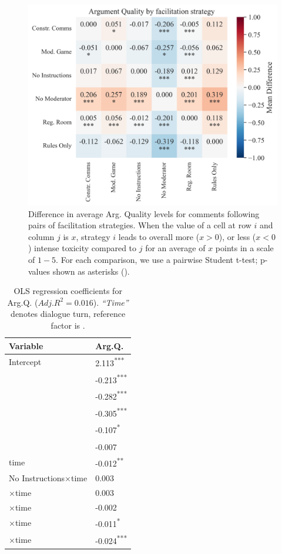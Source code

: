 \begin{figure}[t]
	\includegraphics[width=\linewidth]{resources/argumentq_stats.png}
	\centering
	\caption{Difference in average Arg. Quality levels for comments following pairs of facilitation strategies. When the value of a cell at row $i$ and column $j$ is $x$, strategy $i$ leads to overall more ($x>0$), or less ($x<0$) intense toxicity compared to $j$ for an average of $x$ points in a scale of $1-5$. For each comparison, we use a pairwise Student t-test; p-values shown as asterisks (\asterisknote).}
	\label{fig:aq_stats}
\end{figure}


\begin{table}[t]
	\centering
	\begin{tabular}{p{5cm} p{1.5cm}}
		\toprule
		\textbf{Variable} & \textbf{Arg.Q.} \\
		\midrule
		Intercept & 2.113\textsuperscript{***} \\
		\strategynoinstr & -0.213\textsuperscript{***} \\
		\strategymodgame & -0.282\textsuperscript{***} \\
		\strategyrules & -0.305\textsuperscript{***} \\
		\strategyregroom & -0.107\textsuperscript{*} \\
		\strategyconstrcomm & -0.007\textsuperscript{} \\
		time & -0.012\textsuperscript{**} \\
		No Instructions$\times$time & 0.003 \\
		\strategymodgame$\times$time & 0.003 \\
		\strategyrules$\times$time & -0.002 \\
		\strategyregroom$\times$time & -0.011\textsuperscript{*} \\
		\strategyconstrcomm$\times$time & -0.024\textsuperscript{***} \\
		\bottomrule
	\end{tabular}
	\small
	\asterisknote
	\normalsize
	\caption{OLS regression coefficients for Arg.Q. ($Adj.R^2=0.016$). \textit{“Time”} denotes dialogue turn, reference factor is \emph{\strategynomod}.}
	\label{tab:argq}
\end{table}



